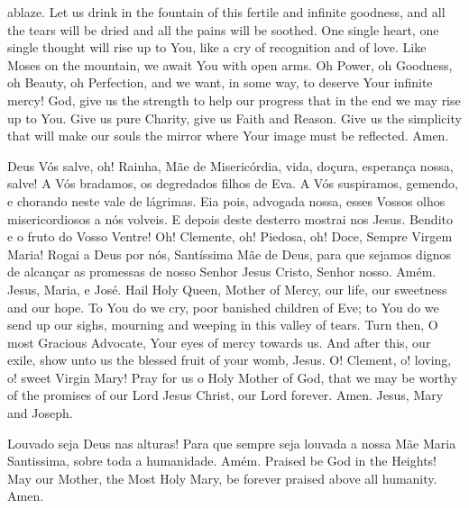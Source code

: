    ablaze.
    \parspace
    Let us drink in the fountain of this fertile and
    infinite goodness, and all the tears will be dried
    and all the pains will be soothed.
    \parspace
    One single  heart, one single thought will rise up
    to You, like a cry of recognition and of love.
    \parspace
    Like Moses on the mountain, we await You with open
    arms.
    \parspace
    Oh Power, oh Goodness, oh Beauty, oh Perfection,
    and we want, in some way, to deserve Your infinite
    mercy!
    \parspace
    God, give us the strength to help our progress that
    in the end we may rise up to You.
    \parspace
    Give us pure Charity, give us Faith and Reason.
    \parspace
    Give us the simplicity that will make our souls the
    mirror where Your image must be reflected.
    \parspace
    Amen.
  \endverse
\endsong


  \beginverse
    Deus Vós salve, oh! Rainha, Mãe de Misericórdia,
    vida, doçura, esperança nossa, salve!
    \parspace
    A Vós bradamos, os degredados filhos de Eva.
    \parspace
    A Vós suspiramos, gemendo, e chorando neste vale de
    lágrimas.
    \parspace
    Eia pois, advogada nossa, esses Vossos olhos
    misericordiosos a nós volveis.
    \parspace
    E depois deste desterro mostrai nos Jesus.
    \parspace
    Bendito e o fruto do Vosso Ventre!
    \parspace
    Oh! Clemente, oh! Piedosa, oh! Doce, Sempre Virgem
    Maria!
    \parspace
    Rogai a Deus por nós, Santíssima Mãe de Deus, para
    que sejamos dignos de alcançar as promessas de nosso
    Senhor Jesus Cristo, Senhor nosso.
    \parspace
    Amém. Jesus, Maria, e José.
  \endverse
  \beginverse
    Hail Holy Queen, Mother of Mercy, our life, our
    sweetness and our hope.
    \parspace
    To You do we cry, poor banished children of Eve;
    \parspace
    to You do we send up our sighs, mourning and weeping
    in this valley of tears.
    \parspace
    Turn then, O most Gracious Advocate, Your eyes of
    mercy towards us.
    \parspace
    And after this, our exile, show unto us the blessed
    fruit of your womb, Jesus.
    \parspace
    O! Clement, o! loving, o! sweet Virgin Mary!
    \parspace
    Pray for us o Holy Mother of God, that we may be
    worthy of the promises of our Lord Jesus Christ,
    our Lord forever.
    \parspace
    Amen. Jesus, Mary and Joseph.
  \endverse
\endsong


  \beginverse
    Louvado seja Deus nas alturas!
    Para que sempre seja louvada
    a nossa Mãe Maria Santissima,
    sobre toda a humanidade.
    Amém.
  \endverse
  \beginverse
    Praised be God in the Heights!
    May our Mother, the Most Holy Mary,
    be forever praised above all humanity.
    Amen.
  \endverse
\endsong


